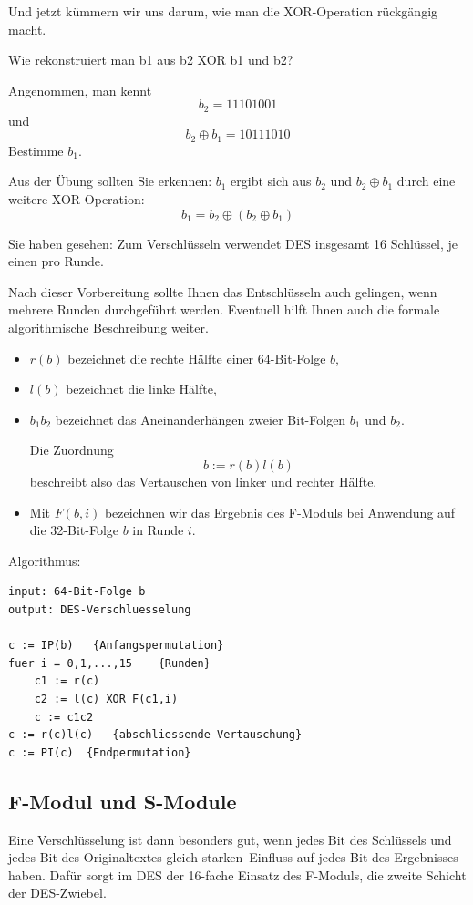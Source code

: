 \documentclass[%
11pt,%
twoside,%
titlepage,%
german,%
headsepline%
]{scrartcl}
\begin{document}
Und jetzt kümmern wir uns darum, wie man die XOR-Operation rückgängig macht.

Wie rekonstruiert man b1 aus b2 XOR b1 und b2?

\begin{ueb}
Angenommen, man kennt
$$b_2=11101001$$
und
$$b_2\oplus b_1=10111010$$
Bestimme $b_1$.
\end{ueb}

Aus der Übung sollten Sie erkennen: $b_1$ ergibt sich aus $b_2$ und $b_2\oplus b_1$ durch eine weitere XOR-Operation:
$$b_1=b_2\oplus(b_2\oplus b_1)$$

Sie haben gesehen: Zum Verschlüsseln verwendet DES insgesamt 16 Schlüssel, je einen pro Runde.

Nach dieser Vorbereitung sollte Ihnen das Entschlüsseln auch gelingen, wenn mehrere Runden durchgeführt werden. 
Eventuell hilft Ihnen auch die  formale algorithmische Beschreibung weiter.

\begin{itemize}
\item $r(b)$ bezeichnet die rechte Hälfte einer 64-Bit-Folge $b$,
\item $l(b)$ bezeichnet die linke Hälfte,
\item $b_1b_2$ bezeichnet das Aneinanderhängen zweier Bit-Folgen $b_1$ und $b_2$.

Die Zuordnung
$$b := r(b)l(b)$$
beschreibt also das Vertauschen von linker und rechter Hälfte. 
\item Mit $F(b,i)$ bezeichnen wir das Ergebnis des F-Moduls bei Anwendung auf die 32-Bit-Folge $b$ in Runde $i$.
\end{itemize}

Algorithmus:
{
\lstset{language=Java}
\begin{lstlisting}
input: 64-Bit-Folge b 
output: DES-Verschluesselung

c := IP(b)   {Anfangspermutation}
fuer i = 0,1,...,15    {Runden}
    c1 := r(c)
    c2 := l(c) XOR F(c1,i)
    c := c1c2
c := r(c)l(c)   {abschliessende Vertauschung}
c := PI(c)  {Endpermutation}
\end{lstlisting}
}

\subsection{F-Modul und S-Module}
Eine Verschlüsselung ist dann besonders gut, wenn jedes Bit des Schlüssels und jedes Bit des Originaltextes \glqq gleich starken\grqq\ Einfluss auf jedes Bit des Ergebnisses haben. 
Dafür sorgt im DES der 16-fache Einsatz des F-Moduls, die zweite Schicht der DES-Zwiebel.
\end{document}
